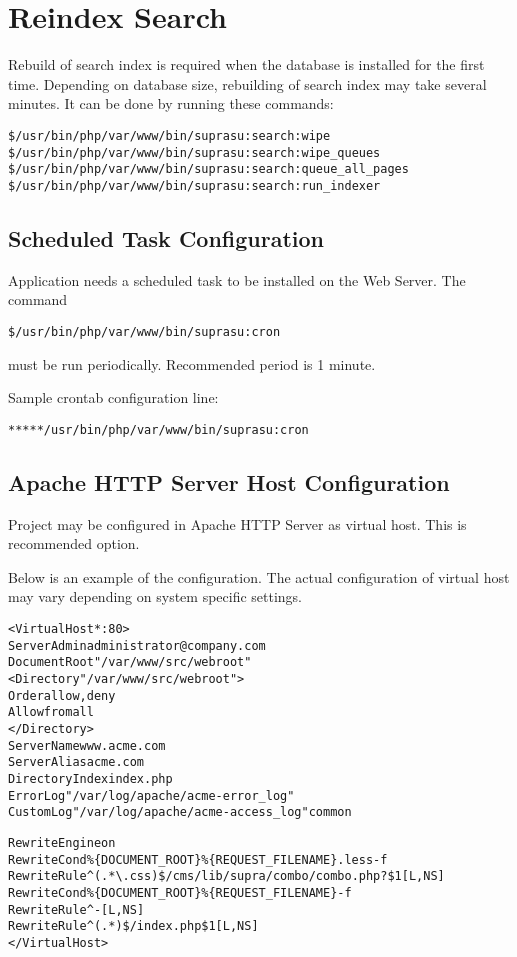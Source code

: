 \documentclass[12pt]{article}
\newcommand{\vigPathToProject}{/var/www}
\newcommand{\vigPathToSrc}{/src}
\newcommand{\vigPathToWebroot}{\vigPathToSrc/webroot}
\begin{document}
\section{Reindex Search}
Rebuild of search index is required when the database is installed for the first time. Depending on database size, rebuilding of search index may take several minutes. It can be done by running these commands:

\begin{alltt}
\$ /usr/bin/php \vigPathToProject/bin/supra su:search:wipe
\$ /usr/bin/php \vigPathToProject/bin/supra su:search:wipe_queues
\$ /usr/bin/php \vigPathToProject/bin/supra su:search:queue_all_pages
\$ /usr/bin/php \vigPathToProject/bin/supra su:search:run_indexer
\end{alltt}

\subsection{Scheduled Task Configuration}

Application needs a scheduled task to be installed on the Web Server. The command

\begin{alltt}
\$ /usr/bin/php \vigPathToProject/bin/supra su:cron
\end{alltt}

must be run periodically. Recommended period is 1 minute.

Sample \textsf{crontab} configuration line:

\begin{alltt}
* * * * * /usr/bin/php \vigPathToProject/bin/supra su:cron
\end{alltt}

\subsection{Apache HTTP Server Host Configuration}

Project may be configured in Apache HTTP Server as virtual host. This is recommended option.

Below is an example of the configuration. The actual configuration of virtual host may vary depending on system specific settings.

\begin{alltt}
<VirtualHost *:80>
  ServerAdmin administrator@company.com
  DocumentRoot "\vigPathToProject\vigPathToWebroot"
  <Directory "\vigPathToProject\vigPathToWebroot">
    Order allow,deny
    Allow from all
  </Directory>
  ServerName www.acme.com
  ServerAlias acme.com
  DirectoryIndex index.php
  ErrorLog "/var/log/apache/acme-error\_log"
  CustomLog "/var/log/apache/acme-access\_log" common

  RewriteEngine on
  RewriteCond \%\{DOCUMENT_ROOT\}\%\{REQUEST_FILENAME\}.less -f
  RewriteRule ^(.*\textbackslash.css)\$ /cms/lib/supra/combo/combo.php?\$1 [L,NS]  
  RewriteCond \%\{DOCUMENT_ROOT\}\%\{REQUEST_FILENAME\} -f
  RewriteRule ^ - [L,NS]
  RewriteRule ^(.*)\$ /index.php\$1 [L,NS]
</VirtualHost>
\end{alltt}
\end{document}
